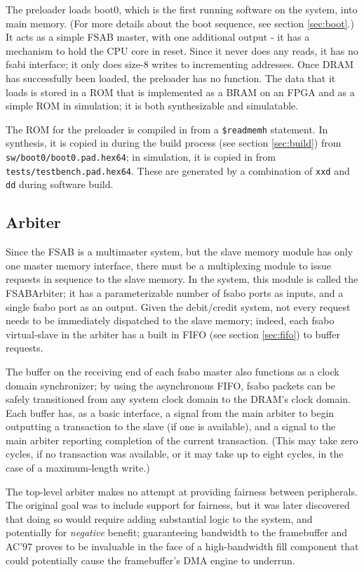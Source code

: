\documentclass[10pt]{article}
\begin{document}
The preloader loads boot0, which is the first running software on the
system, into main memory.  (For more details about the boot sequence, see
section \ref{sec:boot}.) It acts as a simple FSAB master, with one
additional output - it has a mechanism to hold the CPU core in reset.  Since
it never does any reads, it has no fsabi interface; it only does size-8
writes to incrementing addresses.  Once DRAM has successfully been loaded,
the preloader has no function.  The data that it loads is stored in a ROM
that is implemented as a BRAM on an FPGA and as a simple ROM in simulation;
it is both synthesizable and simulatable.

The ROM for the preloader is compiled in from a \texttt{\$readmemh}
statement.  In synthesis, it is copied in during the build process (see
section \ref{sec:build}) from \texttt{sw/boot0/boot0.pad.hex64}; in
simulation, it is copied in from \texttt{tests/testbench.pad.hex64}.  These
are generated by a combination of \texttt{xxd} and \texttt{dd} during
software build.

\subsection{Arbiter}
\label{sec:arbiter}

Since the FSAB is a multimaster system, but the slave memory module has only
one master memory interface, there must be a multiplexing module to issue
requests in sequence to the slave memory.  In the system, this module is
called the FSABArbiter; it has a parameterizable number of fsabo ports as
inputs, and a single fsabo port as an output.  Given the debit/credit
system, not every request needs to be immediately dispatched to the slave
memory; indeed, each fsabo virtual-slave in the arbiter has a built in FIFO
(see section \ref{sec:fifo}) to buffer requests.

The buffer on the receiving end of each fsabo master also functions as a
clock domain synchronizer; by using the asynchronous FIFO, fsabo packets can
be safely transitioned from any system clock domain to the DRAM's clock
domain. Each buffer has, as a basic interface, a signal from the main
arbiter to begin outputting a transaction to the slave (if one is
available), and a signal to the main arbiter reporting completion of the
current transaction. (This may take zero cycles, if no transaction was
available, or it may take up to eight cycles, in the case of a
maximum-length write.)

The top-level arbiter makes no attempt at providing fairness between
peripherals.  The original goal was to include support for fairness, but it
was later discovered that doing so would require adding substantial logic to
the system, and potentially for \textit{negative} benefit; guaranteeing
bandwidth to the framebuffer and AC'97 proves to be invaluable in the face
of a high-bandwidth fill component that could potentially cause the
framebuffer's DMA engine to underrun.
\end{document}
